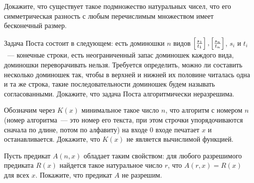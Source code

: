 \begin{task}
    Докажите, что существует такое подмножество натуральных чисел, что его симметрическая разность с любым перечислимым множеством
    имеет бесконечный размер.
\end{task}



\breakline

\begin{ptask}{21}
	Задача Поста состоит в следующем: есть доминошки $n$ видов $\left[\frac{s_1}{t_1}\right], \left[\frac{s_n}{t_n}\right]$, $s_i$ и $t_i$~--- конечные
    строки, есть неограниченный запас доминошек каждого вида, доминошки переворачивать нельзя. Требуется определить, можно ли
    составить несколько доминошек так, чтобы в верхней и нижней их половине читалась одна и та же строка, такие последовательности
    доминошек будем называть согласованными. Докажите, что задача Поста алгоритмически неразрешима.
\end{ptask}


\begin{ptask}{31}
	Обозначим через $K(x)$ минимальное такое число $n$, что алгоритм с номером $n$ (номер алгоритма~--- это номер его текста, при
    этом строчки упорядочиваются сначала по длине, потом по алфавиту) на входе $0$ входе печатает $x$ и останавливается. Докажите,
    что $K(x)$ не является вычислимой функцией.
\end{ptask}

\begin{ptask}{32}
	Пусть предикат $A(n, x)$ обладает таким свойством: для любого разрешимого предиката $R(x)$ найдется такое натуральное число
    $r$, что $A(r, x) = R(x)$ для всех $x$. Покажите, что предикат $A$ не разрешим.
\end{ptask}
